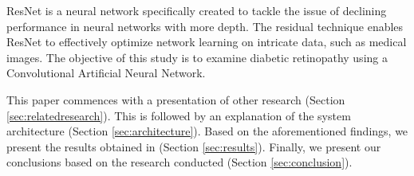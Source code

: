 ResNet is a neural network specifically created to tackle the issue of declining performance in neural networks with more depth. The residual technique enables ResNet to effectively optimize network learning on intricate data, such as medical images. The objective of this study is to examine diabetic retinopathy using a Convolutional Artificial Neural Network. 

This paper commences with a presentation of other research (Section \ref{sec:relatedresearch}).
This is followed by an explanation of the system architecture (Section \ref{sec:architecture}).
Based on the aforementioned findings, we present the results obtained in (Section \ref{sec:results}).
Finally, we present our conclusions based on the research conducted (Section \ref{sec:conclusion}).